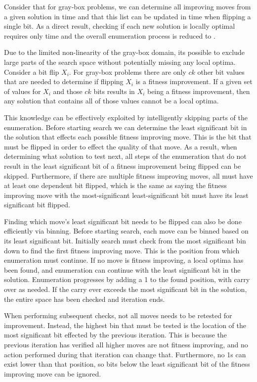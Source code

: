 Consider that for gray-box problems, we can determine all improving moves from a given
solution in  time and that this list can be updated in  time when flipping
a single bit. As a direct result, checking if each new solution is locally optimal requires
only  time and the overall enumeration process is reduced to .

Due to the limited non-linearity of the gray-box domain, its possible to exclude large
parts of the search space without potentially missing any local optima. Consider a bit flip $X_i$.
For gray-box problems there are only $ck$ other bit values that are needed to determine if flipping
$X_i$ is a fitness improvement. If a given set of values for $X_i$ and those $ck$ bits results in
$X_i$ being a fitness improvement, then any solution that contains all of those values cannot be a local optima.

This knowledge can be effectively exploited by intelligently skipping parts of the enumeration.
Before starting search we can determine the least significant bit in the solution that effects
each possible fitness improving move. This is the bit that must be flipped in order to effect
the quality of that move. As a result, when determining what solution to test next, all steps
of the enumeration that do not result in the least significant bit of a fitness improvement being
flipped can be skipped. Furthermore, if there are multiple fitness improving moves, all must
have at least one dependent bit flipped, which is the same as saying the fitness improving move
with the most-significant least-significant bit must have its least significant bit flipped.


Finding which move's least significant bit needs to be flipped can also be done efficiently via binning.
Before starting search, each move can be binned based on its least significant bit. Initially
search must check from the most significant bin down to find the first fitness improving move.
This is the position from which enumeration must continue. If no move is fitness improving, a local
optima has been found, and enumeration can continue with the least significant bit in the solution.
Enumeration progresses by adding a 1 to the found position, with carry over as needed.
If the carry ever exceeds the most significant bit in the solution, the entire space has been checked and iteration ends.

When performing subsequent checks, not all moves needs to be retested for improvement. Instead, the highest
bin that must be tested is the location of the most significant bit effected by the previous iteration. This is because
the previous iteration has verified all higher moves are not fitness improving, and no action performed during
that iteration can change that. Furthermore, no 1s can exist lower than that position, so bits
below the least significant bit of the fitness improving move can be ignored.

